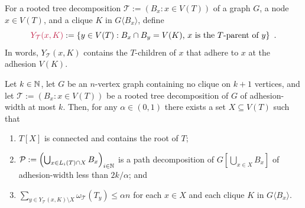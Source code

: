 \documentclass{patmorin}
\makeatletter
\newcommand{\torso}[2]{{#1}\langle{#2}\rangle}
\renewcommand{\le}{\leqslant}
\newcommand{\pat}[1]{\textcolor{Blue}{PaMo: #1}}
\newcommand{\defin}[1]{\emph{\textcolor{brightmaroon}{#1}}}
\def\mathcolor#1#{\@mathcolor{#1}}
\def\@mathcolor#1#2#3{%
  \protect\leavevmode
  \begingroup
    \color#1{#2}#3%
  \endgroup
}
\newcommand{\mathdefin}[1]{\mathcolor{brightmaroon}{#1}}
\makeatother
\begin{document}





  For a rooted tree decomposition $\mathcal{T}:=(B_x:x\in V(T))$ of a graph $G$, a node $x\in V(T)$, and a clique $K$ in $\torso{G}{B_x}$, define
  \[
    \mathdefin{Y_{\mathcal{T}}(x,K)} := \{y\in V(T):\text{$B_x\cap B_y=V(K)$, $x$ is the $T$-parent of $y$}\} \enspace .
  \]
  In words, $Y_{\mathcal{T}}(x,K)$ contains the $T$-children of $x$ that adhere to $x$ at the adhesion $V(K)$.

  \begin{lem}\label{low_adhesion_separator}
    Let $k\in\mathbb{N}$, let $G$ be an $n$-vertex graph containing no clique on $k+1$ vertices, and let $\mathcal{T}:=(B_x:x\in V(T))$ be a rooted tree decomposition of $G$ of adhesion-width at most $k$.  Then, for any $\alpha\in(0,1)$ there exists a set $X\subseteq V(T)$ such that
    \begin{enumerate}[label=(\alph*)]

      \item\label{x_connected} $T[X]$ is connected and contains the root of $T$;

      \item\label{x_adhesion} $\mathcal{P}:=\left(\bigcup_{x\in L_i(T)\cap X} B_x\right)_{i\in\mathbb{N}}$ is a path decomposition of $G[\bigcup_{x\in X}B_x]$ of adhesion-width less than $2k/\alpha$; and

      \item\label{x_alpha} $\sum_{y\in Y_{\mathcal{T}}(x,K)\setminus X}\omega_\mathcal{T}(T_y)\le \alpha n$ for each $x\in X$ and each clique $K$ in $\torso{G}{B_x}$.
    \end{enumerate}
  \end{lem}
\end{document}
